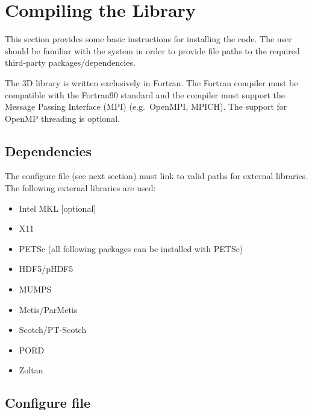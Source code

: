\section{Compiling the Library}
\label{sec:compiling}

This section provides some basic instructions for installing the code. The user should be familiar with the system in order to provide file paths to the required third-party packages/dependencies.

The \hp3D library is written exclusively in Fortran. The Fortran compiler must be compatible with the Fortran90 standard and the compiler must support the Message Passing Interface (MPI) (e.g.~OpenMPI, MPICH). The support for OpenMP threading is optional.

\subsection{Dependencies}
\label{sec:dependencies}

The configure file  (see next section) must link to valid paths for external libraries. The following external libraries are used:
\begin{itemize}
	\itemsep 0pt
	\item Intel MKL [optional]
	\item X11
	\item PETSc (all following packages can be installed with PETSc)
	\item HDF5/pHDF5
	\item MUMPS
	\item Metis/ParMetis
	\item Scotch/PT-Scotch
	\item PORD
	\item Zoltan
\end{itemize}

\subsection{Configure file}
\label{sec:configure-file}

